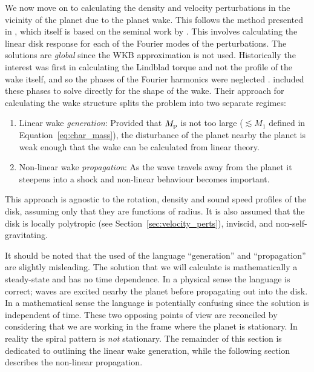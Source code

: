 We now move on to calculating the density and velocity perturbations in the vicinity of the planet due to the planet wake.
This follows the method presented in \citet{goodman2001,rafikov2002a}, which itself is based on the seminal work by \citet{goldreich1978,goldreich1980}.
This involves calculating the linear disk response for each of the Fourier modes of the perturbations.
The solutions are \textit{global} since the WKB approximation is not used.
Historically the interest was first in calculating the Lindblad torque and not the profile of the wake itself, and so the phases of the Fourier harmonics were neglected \citep{goldreich1978,goldreich1980,artymowicz1993a,ward1997}.
\citet{goodman2001} included these phases to solve directly for the shape of the wake.
Their approach for calculating the wake structure splits the problem into two separate regimes: 
\begin{enumerate}
    \item Linear wake \textit{generation}: Provided that $M_{\rm p}$ is not too large ($\lesssim M_1$ defined in Equation~\eqref{eq:char_mass}), the disturbance of the planet nearby the planet is weak enough that the wake can be calculated from linear theory.
    \item Non-linear wake \textit{propagation}: As the wave travels away from the planet it steepens into a shock and non-linear behaviour becomes important.  
\end{enumerate}
This approach is agnostic to the rotation, density and sound speed profiles of the disk, assuming only that they are functions of radius.
It is also assumed that the disk is locally polytropic (see Section~\ref{sec:velocity_perts}), inviscid, and non-self-gravitating.

It should be noted that the used of the language ``generation'' and ``propagation'' are slightly misleading.
The solution that we will calculate is mathematically a steady-state and has no time dependence.
In a physical sense the language is correct; waves are excited nearby the planet before propagating out into the disk.
In a mathematical sense the language is potentially confusing since the solution is independent of time.
These two opposing points of view are reconciled by considering that we are working in the frame where the planet is stationary. 
In reality the spiral pattern is \textit{not} stationary.
The remainder of this section is dedicated to outlining the linear wake generation, while the following section describes the non-linear propagation.

